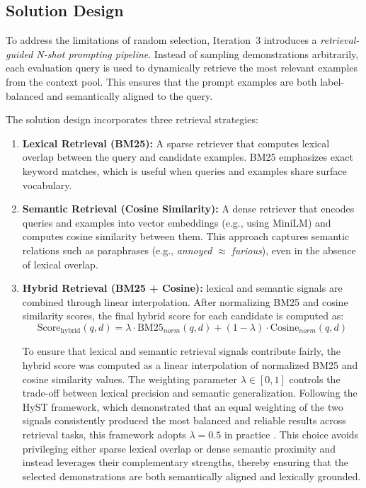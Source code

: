 \subsection{Solution Design}

To address the limitations of random selection, Iteration~3 introduces a \emph{retrieval-guided N-shot prompting pipeline}. 
Instead of sampling demonstrations arbitrarily, each evaluation query is used to dynamically retrieve the most relevant examples from the context pool. 
This ensures that the prompt examples are both label-balanced and semantically aligned to the query. 

The solution design incorporates three retrieval strategies:  

\begin{enumerate}
  \item \textbf{Lexical Retrieval (BM25):}  
  A sparse retriever that computes lexical overlap between the query and candidate examples. 
  BM25 emphasizes exact keyword matches, which is useful when queries and examples share surface vocabulary.  

  \item \textbf{Semantic Retrieval (Cosine Similarity):}  
  A dense retriever that encodes queries and examples into vector embeddings (e.g., using MiniLM) and computes cosine similarity between them. 
  This approach captures semantic relations such as paraphrases (e.g., \emph{annoyed} $\approx$ \emph{furious}), even in the absence of lexical overlap.  

  \item \textbf{Hybrid Retrieval (BM25 + Cosine):}  
  lexical and semantic signals are combined through linear interpolation. 
  After normalizing BM25 and cosine similarity scores, the final hybrid score for each candidate is computed as:
     \[
  \text{Score}_{\text{hybrid}}(q, d) = \lambda \cdot \text{BM25}_{norm}(q, d) + (1 - \lambda) \cdot \text{Cosine}_{norm}(q, d)
  \]
    
    To ensure that lexical and semantic retrieval signals contribute fairly, the 
    hybrid score was computed as a linear interpolation of normalized BM25 
    and cosine similarity values. The weighting parameter 
    $\lambda \in [0,1]$ controls the trade-off between lexical precision and 
    semantic generalization. Following the HyST framework, which 
    demonstrated that an equal weighting of the two signals consistently 
    produced the most balanced and reliable results across retrieval tasks, 
    this framework adopts $\lambda = 0.5$ in practice \cite{hyst2025}. This choice 
    avoids privileging either sparse lexical overlap or dense semantic 
    proximity and instead leverages their complementary strengths, thereby 
    ensuring that the selected demonstrations are both semantically aligned 
    and lexically grounded.
\end{enumerate}


